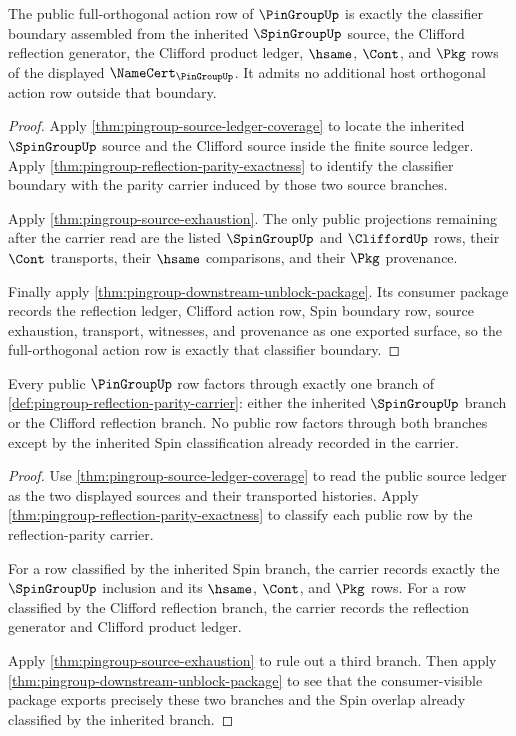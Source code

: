 \begin{theorem}
\label{thm:pingroup-full-orthogonal-action-exactness}
The public full-orthogonal action row of $\PinGroupUp$ is exactly the
classifier boundary assembled from the inherited $\SpinGroupUp$ source, the
Clifford reflection generator, the Clifford product ledger, $\hsame$,
$\Cont$, and $\Pkg$ rows of the displayed $\NameCert_{\PinGroupUp}$. It
admits no additional host orthogonal action row outside that boundary.
\end{theorem}
\begin{proof}
Apply \autoref{thm:pingroup-source-ledger-coverage} to locate the inherited
$\SpinGroupUp$ source and the Clifford source inside the finite source ledger.
Apply \autoref{thm:pingroup-reflection-parity-exactness} to identify the
classifier boundary with the parity carrier induced by those two source
branches.

Apply \autoref{thm:pingroup-source-exhaustion}. The only public projections
remaining after the carrier read are the listed $\SpinGroupUp$ and
$\CliffordUp$ rows, their $\Cont$ transports, their $\hsame$ comparisons, and
their $\Pkg$ provenance.

Finally apply \autoref{thm:pingroup-downstream-unblock-package}. Its consumer
package records the reflection ledger, Clifford action row, Spin boundary row,
source exhaustion, transport, witnesses, and provenance as one exported
surface, so the full-orthogonal action row is exactly that classifier boundary.
\end{proof}

\begin{theorem}
\label{thm:pingroup-reflection-parity-boundary}
Every public $\PinGroupUp$ row factors through exactly one branch of
\autoref{def:pingroup-reflection-parity-carrier}: either the inherited
$\SpinGroupUp$ branch or the Clifford reflection branch. No public row factors
through both branches except by the inherited Spin classification already
recorded in the carrier.
\end{theorem}
\begin{proof}
Use \autoref{thm:pingroup-source-ledger-coverage} to read the public source
ledger as the two displayed sources and their transported histories. Apply
\autoref{thm:pingroup-reflection-parity-exactness} to classify each public row
by the reflection-parity carrier.

For a row classified by the inherited Spin branch, the carrier records exactly
the $\SpinGroupUp$ inclusion and its $\hsame$, $\Cont$, and $\Pkg$ rows. For a
row classified by the Clifford reflection branch, the carrier records the
reflection generator and Clifford product ledger.

Apply \autoref{thm:pingroup-source-exhaustion} to rule out a third branch.
Then apply \autoref{thm:pingroup-downstream-unblock-package} to see that the
consumer-visible package exports precisely these two branches and the Spin
overlap already classified by the inherited branch.
\end{proof}

